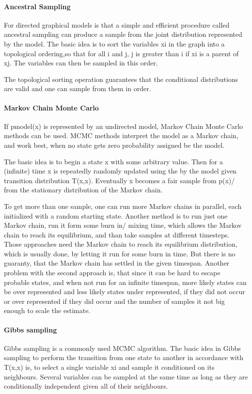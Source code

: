 \paragraph{Ancestral Sampling} For directed graphical models is that a simple and efficient procedure called ancestral sampling can produce a sample from the joint distribution represented by the model. 
The basic idea is to sort the variables xi in the graph into a topological ordering,so that for all i and j, j is greater than i if xi is a parent of xj. The variables can then be sampled in this order.

 The topological sorting operation guarantees that the conditional distributions are valid and one can sample from them in order.

\paragraph{Markov Chain Monte Carlo} If pmodel(x) is represented by an undirected model, Markov Chain Monte Carlo methods can be used. 
MCMC methods interpret the model as a Markov chain, and work best, when no state gets zero probability assigned be the model.

The basic idea is to begin a state x with some arbitrary value. 
Then for a (infinite) time x is repeatedly randomly updated using the by the model given transition distribution T(x,x). 
Eventually x becomes a fair sample from p(x)/ from the stationary distribution of the Markov chain.

To get more than one sample, one can run more Markov chains in parallel, each initialized with a random starting state. 
Another method is to run just one Markov chain, run it form some burn in/ mixing time, which allows the Markov chain to reach its equilibrium, and than take samples at different timesteps.
Those approaches need the Markov chain to reach its equilibrium distribution, which is usually done, by letting it run for some burn in time.
But there is no guaranty, that the Markov chain has settled in the given timespan.    
Another problem with the second approach is, that since it can be hard to escape probable states, and when not run for an infinite timespan, more likely states can be over represented and less likely states under represented, if they did not occur or over represented if they did occur and the number of samples it not big enough to scale the estimate.  

\paragraph{Gibbs sampling} Gibbs sampling is a commonly used MCMC algorithm. The basic idea in Gibbs sampling to perform the transition from one state to another in accordance with T(x,x) is, to select a single variable xi and sample it conditioned on its neighbours. 
Several variables can be sampled at the same time as long as they are conditionally independent given all of their neighbours.

